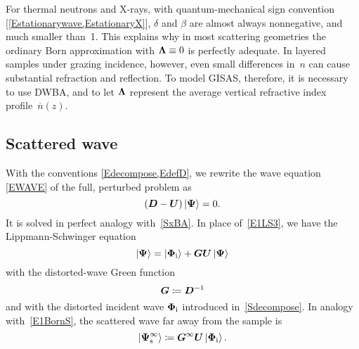 For thermal neutrons and X-rays,
with quantum-mechanical sign convention [\cref{Estationarywave,EstationaryX}],
$\delta$ and $\beta$ are almost always nonnegative,
%
%
and much smaller than~1.
This explains why in most scattering geometries
%
the ordinary Born approximation
%
with $\bm{\Lambda}\equiv0$ is perfectly adequate.
In layered samples under grazing incidence,
%
however, even small differences in~$n$ can cause substantial
refraction and reflection.
%
%
To model GISAS, therefore,
it is necessary to use DWBA,
%
and to let $\bm{\Lambda}$ represent
the average vertical refractive index profile~$\overline{n}(z)$.
%

\subsection{Scattered wave}\label{SxDWBA}

With the conventions \cref{Edecompose,EdefD},
we rewrite the wave equation \cref{EWAVE} of the full, perturbed problem as
\begin{equation}\label{EWave3}
  (\TD-\TU)\ket{\v\Psi} = 0.
\end{equation}
It is solved in perfect analogy with~\cref{SxBA}.
In place of~\cref{E1LS3}, we have the Lippmann-Schwinger equation
%
\begin{equation}\label{ELS3}
   \ket{\v\Psi} = \ket{\v\Phi_\si} + \TG\TU\ket{\v\Psi}
\end{equation}
with the distorted-wave Green function
%
%
\begin{equation}\label{EdefG}
   \TG \coloneqq \TD^{-1}
\end{equation}
and with the distorted incident wave $\bm{\Phi}_{\text{i}}$ introduced in~\cref{Sdecompose}.
In analogy with~\cref{E1BornS}, the scattered wave far away from the sample is
%
%
\begin{equation}\label{EBornS}
  \ket{\v\Psi^\infty_\text{s}}
  \coloneqq \TG^\infty\TU\ket{\v\Phi_\si}.
\end{equation}
%
%

